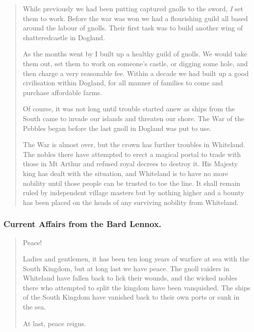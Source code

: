 \begin{multicols}{2}
\begin{quotation}
	While previously we had been putting captured gnolls to the sword, \emph{I} set them to work.
	Before the war was won we had a flourishing guild all based around the labour of gnolls.
	Their first task was to build another wing of \gls{shatteredcastle} in Dogland.

	As the months went by I built up a healthy guild of gnolls.
	We would take them out, set them to work on someone's castle, or digging some hole, and then charge a very reasonable fee.
	Within a decade we had built up a good civilisation within Dogland, for all manner of families to come and purchase affordable farms.

	Of course, it was not long until trouble started anew as ships from the South came to invade our islands and threaten our shore.
	The War of the Pebbles began before the last gnoll in Dogland was put to use.

	The War is almost over, but the crown has further troubles in Whiteland.
	The nobles there have attempted to erect a magical portal to trade with those in Mt Arthur and refused royal decrees to destroy it.
	His Majesty \gls{king} has dealt with the situation, and Whiteland is to have no more nobility until those people can be trusted to toe the line.
	It shall remain ruled by independent village masters but by nothing higher and a bounty has been placed on the heads of any surviving nobility from Whiteland.

\end{quotation}

\subsubsection{Current Affairs from the Bard Lennox.}

\begin{quotation}

	Peace!

	Ladies and gentlemen, it has been ten long years of warfare at sea with the South Kingdom, but at long last we have peace.
	The gnoll raiders in Whiteland have fallen back to lick their wounds, and the wicked nobles there who attempted to split the kingdom have been vanquished.
	The ships of the South Kingdom have vanished back to their own ports or sunk in the sea.

	At last, peace reigns.

\end{quotation}

\end{multicols}

